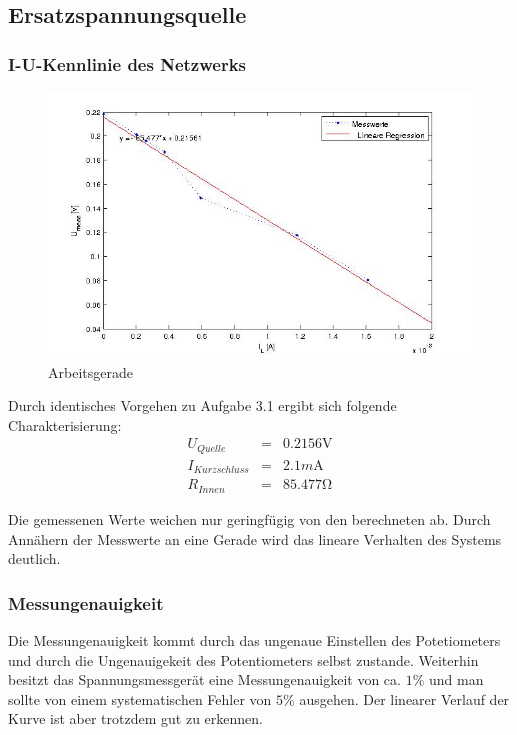 \documentclass[10pt]{report}
\begin{document}
        \subsection{Ersatzspannungsquelle}
        \subsubsection{I-U-Kennlinie des Netzwerks}
        \begin{center}
            \begin{figure}[H]
              \includegraphics[width=\textwidth]{ErsatzspannungsQuelle.jpg}
              \caption{Arbeitsgerade}
            \end{figure}
        \end{center}

        Durch identisches Vorgehen zu Aufgabe 3.1 ergibt sich folgende
        Charakterisierung:
        \begin{eqnarray*}
            U_{Quelle} &=& 0.2156\si{\volt}\\
            I_{Kurzschluss} &=& 2.1\si{m\ampere}\\
            R_{Innen} &=& 85.477\si{\ohm}
        \end{eqnarray*}

		\vspace{0.5cm}

		Die gemessenen Werte weichen nur geringfügig von den berechneten ab. Durch Annähern der Messwerte an eine Gerade wird das lineare Verhalten des Systems deutlich.


        \subsubsection{Messungenauigkeit}
        Die Messungenauigkeit kommt durch das ungenaue Einstellen des Potetiometers
        und durch die Ungenauigekeit des Potentiometers selbst zustande. Weiterhin besitzt
		das Spannungsmessgerät eine Messungenauigkeit von ca. $1\%$ und man sollte von einem
		systematischen Fehler von $5\%$ ausgehen. Der linearer Verlauf der Kurve ist aber
		trotzdem gut zu erkennen.
\end{document}
